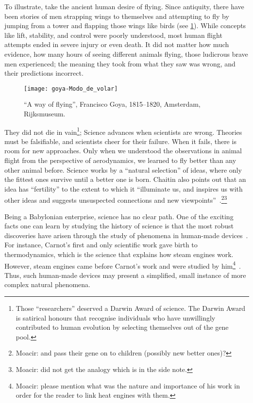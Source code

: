 To illustrate, take the ancient human desire of flying. Since antiquity, there have been stories of men strapping wings to themselves and attempting to fly by jumping from a tower and flapping those wings like birds (see \cref{fig:goya}). While concepts like lift, stability, and control were poorly understood, most human flight attempts ended in severe injury or even death. It did not matter how much evidence, how many hours of seeing different animals flying, those ludicrous brave men experienced; the meaning they took from what they saw was wrong, and their predictions incorrect.
\begin{figure}
	[ht!] \centering
	\texttt{[image: goya-Modo\_de\_volar]}
	\caption{``A way of flying'', Francisco Goya, 1815--1820, Amsterdam, Rijksmuseum.}\label{fig:goya} \end{figure}

They did not die in vain\footnote{Those ``researchers'' deserved a Darwin Award of science. The Darwin Award is satirical honours that recognise individuals who have unwillingly contributed to human evolution by selecting themselves out of the gene pool.}; Science advances when scientists are wrong. Theories must be falsifiable, and scientists cheer for their failure. When it fails, there is room for new approaches. Only when we understood the observations in animal flight from the perspective of aerodynamics, we learned to fly better than any other animal before. Science works by a ``natural selection'' of ideas, where only the fittest ones survive until a better one is born. Chaitin also points out that an idea has ``fertility'' to the extent to which it ``illuminate us, and inspires us with other ideas and suggests unsuspected connections and new viewpoints''~\cite[p. 9]{chaitin:2006}.\footnote{Moacir: and pass their gene on to children (possibly new better ones)?}\footnote{Moacir: did not get the analogy which is in the side note. }

Being a Babylonian enterprise, science has no clear path. One of the exciting facts one can learn by studying the history of science is that the most robust discoveries have arisen through the study of phenomena in human-made devices~\cite{pierce:1980}. For instance, Carnot's first and only scientific work\cite{klein:1974} gave birth to thermodynamics, which is the science that explains how steam engines work. However, steam engines came before Carnot's work and were studied by him\footnote{Moacir: please mention what was the nature and importance of his work in order for the reader to link heat engines with them.}~\cite{pierce:1980}. Thus, such human-made devices may present a simplified, small instance of more complex natural phenomena.

